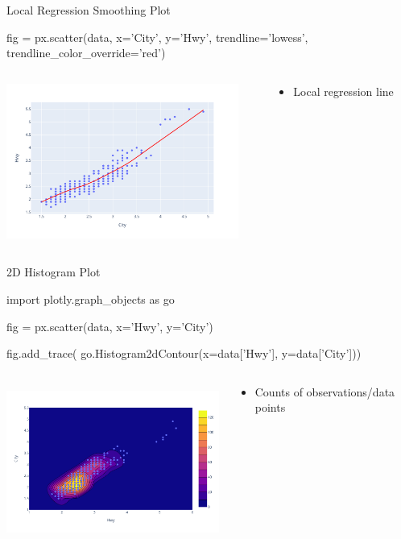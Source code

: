 \documentclass[ignorenonframetext,xcolor=x11names]{beamer}
\begin{document}
\begin{frame}[fragile]{Local Regression Smoothing Plot}
\begin{pythoncode}
fig = px.scatter(data, 
    x='City', y='Hwy', 
    trendline='lowess',
    trendline_color_override='red')
\end{pythoncode}
\begin{columns}
\begin{column}{.65\textwidth}
  \includegraphics[height=2in]{px.fuel.linesSmooth.pdf}
\end{column}
\begin{column}{.35\textwidth}
\footnotesize
  \begin{itemize}
     \item Local regression line
   \end{itemize}
\end{column}
\end{columns}
\end{frame}


\begin{frame}[fragile]{2D Histogram Plot}
\footnotesize
\begin{pythoncode}
import plotly.graph_objects as go

fig = px.scatter(data, x='Hwy', y='City')

fig.add_trace(
  go.Histogram2dContour(x=data['Hwy'], y=data['City']))
\end{pythoncode}
\begin{columns}
\begin{column}{.65\textwidth}
  \includegraphics[height=2in]{px.fuel.density2d.pdf}
\end{column}
\begin{column}{.35\textwidth}
\footnotesize
  \begin{itemize}
     \item Counts of observations/data points
   \end{itemize}
\end{column}
\end{columns}
\end{frame}
\end{document}
